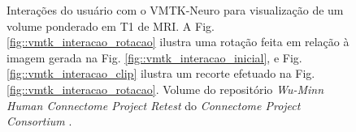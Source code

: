 \begin{figure}[htb]
{{    \label{fig::vmtk_interacao_clip}
    }
    }
    \caption{Interações do usuário com o VMTK-Neuro para visualização de um volume ponderado em T1 de MRI. A Fig. \ref{fig::vmtk_interacao_rotacao} ilustra uma rotação feita em relação à imagem gerada na Fig. \ref{fig::vmtk_interacao_inicial}, e Fig. \ref{fig::vmtk_interacao_clip} ilustra um recorte efetuado na Fig. \ref{fig::vmtk_interacao_rotacao}. Volume do repositório \textit{Wu-Minn Human Connectome Project Retest} do \textit{Connectome Project Consortium} \cite{essen2012}.
    }
    \label{fig::vmtk_interacao}
\end{figure}
 





